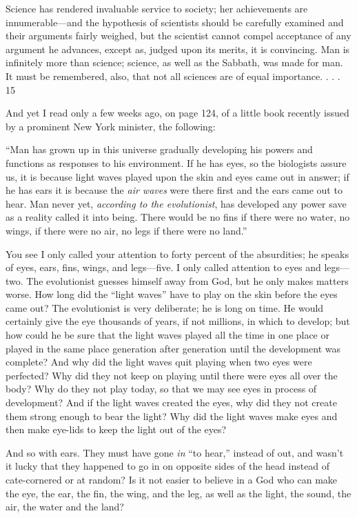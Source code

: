 Science has rendered invaluable service to society; her achievements are innumerable—and
the hypothesis of scientists should be carefully examined and their arguments fairly weighed,
but the scientist cannot compel acceptance of any argument he advances, except as, judged
upon its merits, it is convincing. Man is infinitely more than science; science, as well as the
Sabbath, was made for man. It must be remembered, also, that not all sciences are of equal
importance. . . . 15

And yet I read only a few weeks ago, on page 124, of a little book recently issued by a
prominent New York minister, the following:

``Man has grown up in this universe gradually developing his powers and functions as
responses to his environment. If he has eyes, so the biologists assure us, it is because light
waves played upon the skin and eyes came out in answer; if he has ears it is because the \textit{air
waves} were there first and the ears came out to hear. Man never yet, \textit{according to the
evolutionist}, has developed any power save as a reality called it into being. There would be
no fins if there were no water, no wings, if there were no air, no legs if there were no land.''

You see I only called your attention to forty percent of the absurdities; he speaks of eyes,
ears, fins, wings, and legs—five. I only called attention to eyes and legs—two. The
evolutionist guesses himself away from God, but he only makes matters worse. How long did
the ``light waves'' have to play on the skin before the eyes came out? The evolutionist is very
deliberate; he is long on time. He would certainly give the eye thousands of years, if not
millions, in which to develop; but how could he be sure that the light waves played all the
time in one place or played in the same place generation after generation until the
development was complete? And why did the light waves quit playing when two eyes were
perfected? Why did they not keep on playing until there were eyes all over the body? Why do
they not play today, so that we may see eyes in process of development? And if the light
waves created the eyes, why did they not create them strong enough to bear the light? Why
did the light waves make eyes and then make eye-lids to keep the light out of the eyes?

And so with ears. They must have gone \textit{in} ``to hear,'' instead of out, and wasn't it lucky that
they happened to go in on opposite sides of the head instead of cate-cornered or at random?
Is it not easier to believe in a God who can make the eye, the ear, the fin, the wing, and the
leg, as well as the light, the sound, the air, the water and the land?

